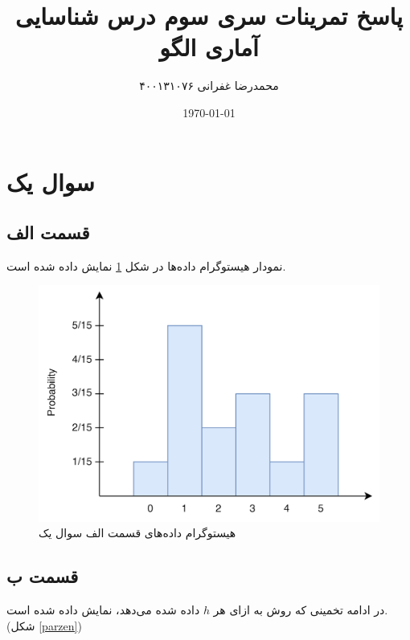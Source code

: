 \documentclass{article}
\title{\vspace{-4cm} \textbf{پاسخ تمرینات سری سوم درس شناسایی آماری الگو}}
\author{محمدرضا غفرانی  ۴۰۰۱۳۱۰۷۶}
\date{\today}
\begin{document}
\maketitle

\section*{سوال یک}

\subsection*{قسمت الف}

نمودار هیستوگرام داده‌ها در شکل \ref{histogram} نمایش داده شده است.

\begin{figure}[h]
    \centering
    \includegraphics[scale=0.5]{images/q1/histogram.png}
    \caption{هیستوگرام داده‌های قسمت الف سوال یک}
    \label{histogram}
\end{figure}

\subsection*{قسمت ب}

در ادامه تخمینی که روش  به ازای هر $h$ داده شده می‌دهد، نمایش داده
شده است. (شکل \ref{parzen})
\end{document}
